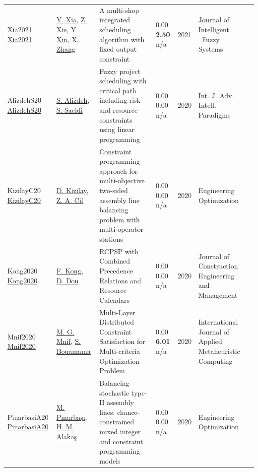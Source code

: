 {\begin{longtable}{p{3cm}p{5cm}p{10cm}p{1cm}rp{2.5cm}l}
Xia2021 \href{http://dx.doi.org/10.3233/jifs-189721}{Xia2021} & \hyperref[auth:a1538]{Y. Xia}, \hyperref[auth:a1539]{Z. Xie}, \hyperref[auth:a1540]{Y. Xin}, \hyperref[auth:a1541]{X. Zhang} & A multi-shop integrated scheduling algorithm with fixed output constraint & \noindent{}\textcolor{black!50}{0.00} \textbf{2.50} n/a & 2021 & Journal of Intelligent \  Fuzzy Systems & \cite{Xia2021}\\
AlizdehS20 \href{https://doi.org/10.1504/IJAIP.2020.106687}{AlizdehS20} & \hyperref[auth:a512]{S. Alizdeh}, \hyperref[auth:a513]{S. Saeidi} & Fuzzy project scheduling with critical path including risk and resource constraints using linear programming & \noindent{}\textcolor{black!50}{0.00} \textcolor{black!50}{0.00} n/a & 2020 & \cellcolor{red!20}Int. J. Adv. Intell. Paradigms & \cite{AlizdehS20}\\
KizilayC20 \href{http://dx.doi.org/10.1080/0305215x.2020.1786081}{KizilayC20} & \hyperref[auth:a1379]{D. Kizilay}, \hyperref[auth:a1380]{Z. A. Cil} & Constraint programming approach for multi-objective two-sided assembly line balancing problem with multi-operator stations & \noindent{}\textcolor{black!50}{0.00} \textcolor{black!50}{0.00} n/a & 2020 & \cellcolor{red!20}Engineering Optimization & \cite{KizilayC20}\\
Kong2020 \href{http://dx.doi.org/10.1061/(asce)co.1943-7862.0001929}{Kong2020} & \hyperref[auth:a1704]{F. Kong}, \hyperref[auth:a1777]{D. Dou} & RCPSP with Combined Precedence Relations and Resource Calendars & \noindent{}\textcolor{black!50}{0.00} \textcolor{black!50}{0.00} n/a & 2020 & Journal of Construction Engineering and Management & \cite{Kong2020}\\
Mnif2020 \href{http://dx.doi.org/10.4018/ijamc.2020040107}{Mnif2020} & \hyperref[auth:a1961]{M. G. Mnif}, \hyperref[auth:a1962]{S. Bouamama} & Multi-Layer Distributed Constraint Satisfaction for Multi-criteria Optimization Problem & \noindent{}\textcolor{black!50}{0.00} \textbf{6.01} n/a & 2020 & International Journal of Applied Metaheuristic Computing & \cite{Mnif2020}\\
PinarbasiA20 \href{http://dx.doi.org/10.1080/0305215x.2020.1716746}{PinarbasiA20} & \hyperref[auth:a1383]{M. Pınarbaşı}, \hyperref[auth:a763]{H. M. Alakaş} & Balancing stochastic type-II assembly lines: chance-constrained mixed integer and constraint programming models & \noindent{}\textcolor{black!50}{0.00} \textcolor{black!50}{0.00} n/a & 2020 & \cellcolor{red!20}Engineering Optimization & \cite{PinarbasiA20}\\

\end{longtable}}
